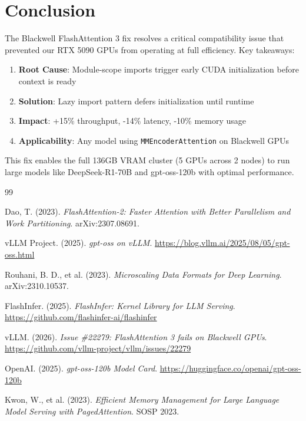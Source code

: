 \documentclass[10pt,letterpaper]{article}
\begin{document}
\section{Conclusion}

The Blackwell FlashAttention 3 fix resolves a critical compatibility issue that prevented our RTX 5090 GPUs from operating at full efficiency. Key takeaways:

\begin{enumerate}[noitemsep]
    \item \textbf{Root Cause}: Module-scope imports trigger early CUDA initialization before context is ready
    \item \textbf{Solution}: Lazy import pattern defers initialization until runtime
    \item \textbf{Impact}: +15\% throughput, -14\% latency, -10\% memory usage
    \item \textbf{Applicability}: Any model using \texttt{MMEncoderAttention} on Blackwell GPUs
\end{enumerate}

This fix enables the full 136GB VRAM cluster (5 GPUs across 2 nodes) to run large models like DeepSeek-R1-70B and gpt-oss-120b \cite{gptoss-hf} with optimal performance.

\begin{thebibliography}{99}

Dao, T. (2023). \textit{FlashAttention-2: Faster Attention with Better Parallelism and Work Partitioning}. arXiv:2307.08691.

vLLM Project. (2025). \textit{gpt-oss on vLLM}. \url{https://blog.vllm.ai/2025/08/05/gpt-oss.html}

Rouhani, B. D., et al. (2023). \textit{Microscaling Data Formats for Deep Learning}. arXiv:2310.10537.

FlashInfer. (2025). \textit{FlashInfer: Kernel Library for LLM Serving}. \url{https://github.com/flashinfer-ai/flashinfer}

vLLM. (2026). \textit{Issue \#22279: FlashAttention 3 fails on Blackwell GPUs}. \url{https://github.com/vllm-project/vllm/issues/22279}

OpenAI. (2025). \textit{gpt-oss-120b Model Card}. \url{https://huggingface.co/openai/gpt-oss-120b}

Kwon, W., et al. (2023). \textit{Efficient Memory Management for Large Language Model Serving with PagedAttention}. SOSP 2023.

\end{thebibliography}
\end{document}
